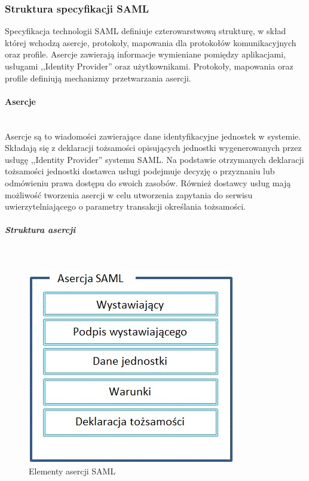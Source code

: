 	\subsubsection{Struktura specyfikacji SAML}

		Specyfikacja technologii SAML definiuje czterowarstwową strukturę, w skład której wchodzą asercje, protokoły, mapowania dla protokołów komunikacyjnych oraz profile. 
		Asercje zawierają informacje wymieniane pomiędzy aplikacjami, usługami ,,Identity Provider'' oraz użytkownikami. Protokoły, mapowania oraz profile definiują mechanizmy przetwarzania asercji.

		\paragraph{Asercje}\mbox{}\\
					
			Asercje są to wiadomości zawierające dane identyfikacyjne jednostek w systemie. Składają się z deklaracji tożsamości opisujących jednostki wygenerowanych przez usługę ,,Identity Provider'' systemu SAML. Na podstawie otrzymanych deklaracji tożsamości jednostki dostawca usługi podejmuje decyzję o przyznaniu lub odmówieniu prawa dostępu do swoich zasobów. Również dostawcy usług mają możliwość tworzenia asercji w celu utworzenia zapytania do serwisu uwierzytelniającego o parametry transakcji określania tożsamości. 

			\subparagraph{Struktura asercji}\mbox{}\\
			
				\begin{figure}[h]
				\centering
					\includegraphics{img/samlAssertion.jpg}
				\caption{Elementy asercji SAML}
				\label{Elementy asercji SAML}
				\end{figure}

